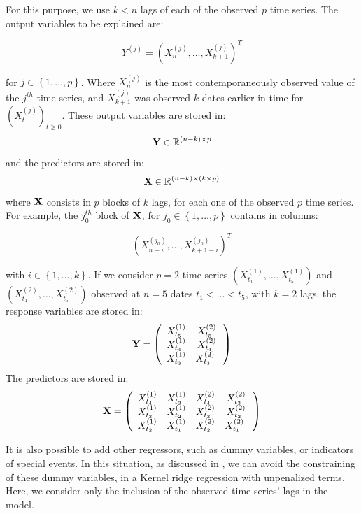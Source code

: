 \medskip

For this purpose, we use $k < n$ lags of each of the observed $p$ time
series. The output variables to be explained are:

\begin{equation}
Y^{(j)} = \left(X^{(j)}_n, \ldots, X^{(j)}_{k+1} \right)^T
\end{equation}

for $j \in \left\lbrace 1, \ldots,
p \right\rbrace$. Where $X^{(j)}_n$ is the most contemporaneously observed value
of the $j^{th}$ time series, and $X^{(j)}_{k+1}$ was observed $k$ dates earlier
in time for $(X^{(j)}_t)_{t \geq 0}$. These output variables are stored in: $$ {\bf Y} \in \mathbb{R}^{(n-k) \times p} $$ and the predictors are
stored in: $$ {\bf X} \in \mathbb{R}^{(n-k) \times (k \times p)} $$
where ${\bf X}$ consists in $p$ blocks of $k$ lags, for each one of the observed
$p$ time series. For example, the $j_0^{th}$ block of ${\bf X}$, for $j_0 \in
\left\lbrace 1, \ldots, p \right\rbrace$  contains in columns:

\begin{equation}
\left( X^{(j_0)}_{n-i}, \ldots, X^{(j_0)}_{k+1-i} \right)^T
\end{equation}

with $i \in
\left\lbrace 1, \ldots, k \right\rbrace$. If we consider $p = 2$ time series $(X^{(1)}_{t_1}, \ldots,  X^{(1)}_{t_5})$ and $(X^{(2)}_{t_1}, \ldots,  X^{(2)}_{t_5})$ observed at $n = 5$ dates $t_1 < \ldots < t_5$, with $k = 2$ lags,  the response variables are stored in:
$$
{\bf Y} = \left( {\begin{array}{cc} X^{(1)}_{t_5} &  X^{(2)}_{t_5}\\ X^{(1)}_{t_4} & X^{(2)}_{t_4} \\ X^{(1)}_{t_3} & X^{(2)}_{t_3}\      \end{array} } \right)
$$
The predictors are stored in:
$$
{\bf X} = \left( {\begin{array}{cccc} X^{(1)}_{t_4} & X^{(1)}_{t_3} & X^{(2)}_{t_4} & X^{(2)}_{t_3} \\ X^{(1)}_{t_3} & X^{(1)}_{t_2} & X^{(2)}_{t_3} & X^{(2)}_{t_2} \\ X^{(1)}_{t_2} & X^{(1)}_{t_1} & X^{(2)}_{t_2} & X^{(2)}_{t_1} \      \end{array} }\right)
$$


It is also possible to add other regressors, such as dummy variables, or indicators of special events. In this situation, as discussed in \cite{exterkate2016nonlinear}, we can avoid the constraining of these dummy variables, in a Kernel ridge regression with unpenalized terms. Here, we consider only the inclusion of the observed time series' lags in the model.

